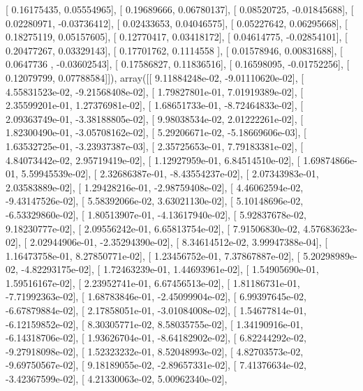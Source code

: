 \documentclass{article}
\begin{document}
       [ 0.16175435,  0.05554965],
       [ 0.19689666,  0.06780137],
       [ 0.08520725, -0.01845688],
       [ 0.02280971, -0.03736412],
       [ 0.02433653,  0.04046575],
       [ 0.05227642,  0.06295668],
       [ 0.18275119,  0.05157605],
       [ 0.12770417,  0.03418172],
       [ 0.04614775, -0.02854101],
       [ 0.20477267,  0.03329143],
       [ 0.17701762,  0.1114558 ],
       [ 0.01578946,  0.00831688],
       [ 0.0647736 , -0.03602543],
       [ 0.17586827,  0.11836516],
       [ 0.16598095, -0.01752256],
       [ 0.12079799,  0.07788584]]), array([[  9.11884248e-02,  -9.01110620e-02],
       [  4.55831523e-02,  -9.21568408e-02],
       [  1.79827801e-01,   7.01919389e-02],
       [  2.35599201e-01,   1.27376981e-02],
       [  1.68651733e-01,  -8.72464833e-02],
       [  2.09363749e-01,  -3.38188805e-02],
       [  9.98038534e-02,   2.01222261e-02],
       [  1.82300490e-01,  -3.05708162e-02],
       [  5.29206671e-02,  -5.18669606e-03],
       [  1.63532725e-01,  -3.23937387e-03],
       [  2.35725653e-01,   7.79183381e-02],
       [  4.84073442e-02,   2.95719419e-02],
       [  1.12927959e-01,   6.84514510e-02],
       [  1.69874866e-01,   5.59945539e-02],
       [  2.32686387e-01,  -8.43554237e-02],
       [  2.07343983e-01,   2.03583889e-02],
       [  1.29428216e-01,  -2.98759408e-02],
       [  4.46062594e-02,  -9.43147526e-02],
       [  5.58392066e-02,   3.63021130e-02],
       [  5.10148696e-02,  -6.53329860e-02],
       [  1.80513907e-01,  -4.13617940e-02],
       [  5.92837678e-02,   9.18230777e-02],
       [  2.09556242e-01,   6.65813754e-02],
       [  7.91506830e-02,   4.57683623e-02],
       [  2.02944906e-01,  -2.35294390e-02],
       [  8.34614512e-02,   3.99947388e-04],
       [  1.16473758e-01,   8.27850771e-02],
       [  1.23456752e-01,   7.37867887e-02],
       [  5.20298989e-02,  -4.82293175e-02],
       [  1.72463239e-01,   1.44693961e-02],
       [  1.54905690e-01,   1.59516167e-02],
       [  2.23952741e-01,   6.67456513e-02],
       [  1.81186731e-01,  -7.71992363e-02],
       [  1.68783846e-01,  -2.45099904e-02],
       [  6.99397645e-02,  -6.67879884e-02],
       [  2.17858051e-01,  -3.01084008e-02],
       [  1.54677814e-01,  -6.12159852e-02],
       [  8.30305771e-02,   8.58035755e-02],
       [  1.34190916e-01,  -6.14318706e-02],
       [  1.93626704e-01,  -8.64182902e-02],
       [  6.82244292e-02,  -9.27918098e-02],
       [  1.52323232e-01,   8.52048993e-02],
       [  4.82703573e-02,  -9.69750567e-02],
       [  9.18189055e-02,  -2.89657331e-02],
       [  7.41376634e-02,  -3.42367599e-02],
       [  4.21330063e-02,   5.00962340e-02],
\end{document}
